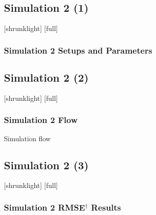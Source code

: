 \documentclass[12pt,compress,aspectratio=169]{beamer} %
\begin{document}
\subsection{Simulation 2 (1)}
[shrunklight]
[full]
\begin{frame}
	\frametitle{Simulation 2 Setups and Parameters}
	\centering
	\begin{table}
	\begin{center}
	\end{center}
	\end{table}
\end{frame}


\subsection{Simulation 2 (2)}
[shrunklight]
[full]
\begin{frame}
	\frametitle{Simulation 2 Flow}
	\centering
	Simulation flow
	\vspace*{0.5cm}
	
\end{frame}


\subsection{Simulation 2 (3)}
[shrunklight]
[full]
\begin{frame}
	\frametitle{Simulation 2 RMSE$^{\dagger}$ Results}
	\centering
	\vspace*{0.2cm}
	
\end{frame}
\end{document}
